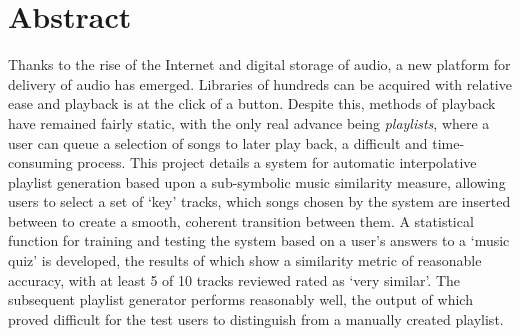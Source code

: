 \section*{Abstract}
Thanks to the rise of the Internet and digital storage of audio, a new platform for delivery of audio has emerged. Libraries of hundreds can be acquired with relative ease and playback is at the click of a button. 
Despite this, methods of playback have remained fairly static, with the only real advance being \emph{playlists}, where a user can queue a selection of songs to later play back, a difficult and time-consuming process.
This project details a system for automatic interpolative playlist generation based upon a sub-symbolic music similarity measure, allowing users to select a set of `key' tracks, which songs chosen by the system are inserted between to create a smooth, coherent transition between them.
A statistical function for training and testing the system based on a user's answers to a `music quiz' is developed, the results of which show a similarity metric of reasonable accuracy, with at least 5 of 10 tracks reviewed rated as `very similar'. The subsequent playlist generator performs reasonably well, the output of which proved difficult for the test users to distinguish from a manually created playlist.


\vspace{8cm}
